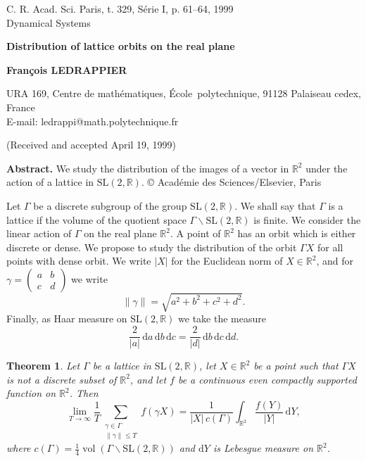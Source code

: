 \documentclass[11pt]{article}
\newtheorem{theorem}{Theorem}
\theoremstyle{remark}
\newcommand{\R}{\mathbb{R}}
\newcommand{\rd}{\mathrm{d}}
\newcommand{\SL}{\mathrm{SL}}
\newcommand{\vol}{\operatorname{vol}}
\begin{document}
\begin{center}
{\small C. R. Acad. Sci. Paris, t. 329, S\'erie I, p. 61--64, 1999\\
Dynamical Systems}

\vspace{1.5cm}

{\LARGE\bfseries Distribution of lattice orbits on the real plane}

\vspace{0.5cm}

{\large\bfseries Fran\c{c}ois LEDRAPPIER}

\vspace{0.3cm}

URA 169, Centre de math\'ematiques, \mbox{\'Ecole polytechnique}, 91128 Palaiseau cedex, France\\
E-mail: ledrappi@math.polytechnique.fr

\vspace{0.3cm}

(Received and accepted April 19, 1999)
\end{center}

\vspace{0.8cm}

\noindent\textbf{Abstract.}\quad
We study the distribution of the images of a vector in $\R^2$ under the action of a lattice in
$\SL(2,\R)$. \copyright{} Acad\'emie des Sciences/Elsevier, Paris

\vspace{0.8cm}

Let $\Gamma$ be a discrete subgroup of the group $\SL(2,\R)$. We shall say that $\Gamma$ is a lattice if the volume of the quotient space $\Gamma\backslash\SL(2,\R)$ is finite. We consider the linear action of $\Gamma$ on the real plane $\R^2$. A point of $\R^2$ has an orbit which is either discrete or dense. We propose to study the distribution of the orbit $\Gamma X$ for all points with dense orbit. We write $|X|$ for the Euclidean norm of $X\in\R^2$, and for
$\gamma=\begin{pmatrix}a&b\\ c&d\end{pmatrix}$ we write
\[
\|\gamma\|=\sqrt{a^2+b^2+c^2+d^2}.
\]
Finally, as Haar measure on $\SL(2,\R)$ we take the measure
\[
\frac{2}{|a|}\, \rd a\, \rd b\, \rd c=\frac{2}{|d|}\, \rd b\, \rd c\, \rd d.
\]

\begin{theorem}
Let $\Gamma$ be a lattice in $\SL(2,\R)$, let $X\in\R^2$ be a point such that $\Gamma X$ is not a discrete subset of $\R^2$, and let $f$ be a continuous even compactly supported function on $\R^2$. Then
\begin{equation}\tag{$*$}
\lim_{T\to\infty}\frac{1}{T}\sum_{\substack{\gamma\in\Gamma\\ \|\gamma\|\le T}} f(\gamma X)
=\frac{1}{|X|\,c(\Gamma)}\int_{\R^2}\frac{f(Y)}{|Y|}\,\rd Y,
\end{equation}
where $c(\Gamma)=\frac14\vol(\Gamma\backslash\SL(2,\R))$ and $\rd Y$ is Lebesgue measure on $\R^2$.
\end{theorem}
\end{document}

